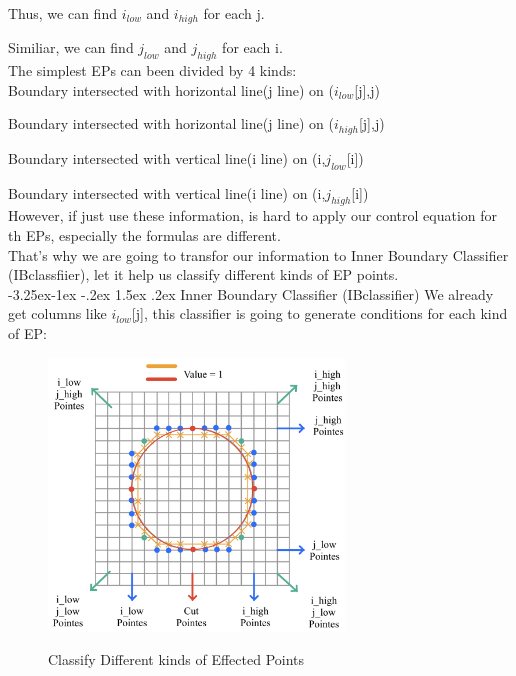 \documentclass[12pt]{article}
\makeatletter
\renewcommand\paragraph{\@startsection{paragraph}{4}{\z@}%
                                     {-3.25ex\@plus -1ex \@minus -.2ex}%
                                     {1.5ex \@plus .2ex}%
                                     {\normalfont\normalsize\bfseries}}
\makeatother
\begin{document}
Thus, we can find $i_{low}$ and $i_{high}$ for each j.

Similiar, we can find $j_{low}$ and $j_{high}$ for each i.\\



The simplest EPs can been divided by 4 kinds:\\

Boundary intersected with horizontal line(j line) on ($i_{low}$[j],j)

Boundary intersected with horizontal line(j line) on ($i_{high}$[j],j)

Boundary intersected with vertical line(i line) on (i,$j_{low}$[i])

Boundary intersected with vertical line(i line) on (i,$j_{high}$[i])\\


However, if just use these information, is hard to apply our control 
equation for th EPs, especially the formulas are different.\\

That's why we are going to transfor our information to 
Inner Boundary Classifier (IBclassfiier),
let it help us classify different kinds of EP points.\\

\paragraph{Inner Boundary Classifier (IBclassifier)}
We already get columns like $i_{low}$[j], this classifier is going to
generate conditions for each kind of EP:




\begin{figure}[H]
    \centering
    \includegraphics[width=0.7\textwidth]{Point_Classify.jpg}
    \label{Point_Classify.jpg    }
    \caption{Classify Different kinds of Effected Points}
\end{figure}
\end{document}
